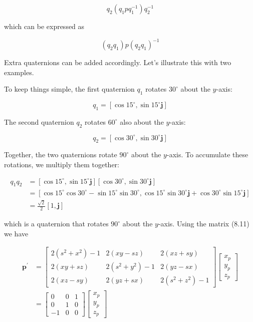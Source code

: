 \documentclass[10pt]{article}
\begin{document}
$$
q_{2}\left(q_{1} p q_{1}^{-1}\right) q_{2}^{-1}
$$

which can be expressed as

$$
\left(q_{2} q_{1}\right) p\left(q_{2} q_{1}\right)^{-1}
$$

Extra quaternions can be added accordingly. Let's illustrate this with two examples.

To keep things simple, the first quaternion $q_{1}$ rotates $30^{\circ}$ about the $y$-axis:

$$
q_{1}=\left[\cos 15^{\circ}, \sin 15^{\circ} \mathbf{j}\right]
$$

The second quaternion $q_{2}$ rotates $60^{\circ}$ also about the $y$-axis:

$$
q_{2}=\left[\cos 30^{\circ}, \sin 30^{\circ} \mathbf{j}\right]
$$

Together, the two quaternions rotate $90^{\circ}$ about the $y$-axis. To accumulate these rotations, we multiply them together:

$$
\begin{aligned}
q_{1} q_{2} & =\left[\cos 15^{\circ}, \sin 15^{\circ} \mathbf{j}\right]\left[\cos 30^{\circ}, \sin 30^{\circ} \mathbf{j}\right] \\
& =\left[\cos 15^{\circ} \cos 30^{\circ}-\sin 15^{\circ} \sin 30^{\circ}, \cos 15^{\circ} \sin 30^{\circ} \mathbf{j}+\cos 30^{\circ} \sin 15^{\circ} \mathbf{j}\right] \\
& =\frac{\sqrt{2}}{2}[1, \mathbf{j}]
\end{aligned}
$$

which is a quaternion that rotates $90^{\circ}$ about the $y$-axis. Using the matrix (8.11) we have

$$
\begin{aligned}
\mathbf{p}^{\prime} & =\left[\begin{array}{ccc}
2\left(s^{2}+x^{2}\right)-1 & 2(x y-s z) & 2(x z+s y) \\
2(x y+s z) & 2\left(s^{2}+y^{2}\right)-1 & 2(y z-s x) \\
2(x z-s y) & 2(y z+s x) & 2\left(s^{2}+z^{2}\right)-1
\end{array}\right]\left[\begin{array}{l}
x_{p} \\
y_{p} \\
z_{p}
\end{array}\right] \\
& =\left[\begin{array}{ccc}
0 & 0 & 1 \\
0 & 1 & 0 \\
-1 & 0 & 0
\end{array}\right]\left[\begin{array}{l}
x_{p} \\
y_{p} \\
z_{p}
\end{array}\right]
\end{aligned}
$$
\end{document}
